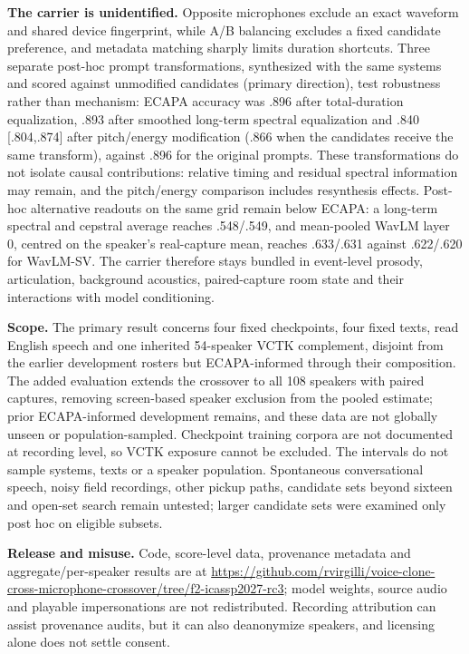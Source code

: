 \documentclass[10pt,twocolumn,letterpaper]{article}
\begin{document}
\textbf{The carrier is unidentified.} Opposite microphones exclude an exact
waveform and shared device fingerprint, while A/B balancing excludes a fixed
candidate preference, and metadata matching sharply limits duration shortcuts.
Three separate post-hoc prompt transformations, synthesized with the same
systems and scored against unmodified candidates (primary direction), test
robustness rather than mechanism: ECAPA accuracy was .896 after
total-duration equalization, .893 after smoothed long-term spectral
equalization and .840 [.804,.874] after pitch/energy modification (.866 when
the candidates receive the same transform), against .896 for the original
prompts. These transformations do not isolate causal contributions: relative
timing and residual spectral information may remain, and the pitch/energy
comparison includes resynthesis effects. Post-hoc alternative readouts on the
same grid remain below ECAPA: a long-term spectral and cepstral average reaches
.548/.549, and mean-pooled WavLM layer 0, centred on the speaker's real-capture
mean, reaches .633/.631 against .622/.620 for WavLM-SV. The carrier therefore
stays bundled in event-level prosody, articulation, background acoustics,
paired-capture room state and their interactions with model conditioning.

\textbf{Scope.} The primary result concerns four fixed checkpoints, four fixed
texts, read English speech and one inherited 54-speaker VCTK complement,
disjoint from the earlier development rosters but ECAPA-informed through their
composition. The added evaluation extends the crossover to all 108 speakers
with paired captures, removing screen-based speaker exclusion from the pooled
estimate; prior ECAPA-informed development remains, and these data are not
globally unseen or population-sampled. Checkpoint
training corpora are not documented at recording level, so VCTK exposure cannot be
excluded. The intervals do not sample systems, texts or a speaker
population. Spontaneous conversational speech, noisy field recordings, other
pickup paths, candidate sets beyond sixteen and open-set search remain
untested; larger candidate sets were examined only post hoc on eligible
subsets.

\textbf{Release and misuse.} Code, score-level data, provenance metadata and
aggregate/per-speaker results are at \url{https://github.com/rvirgilli/voice-clone-cross-microphone-crossover/tree/f2-icassp2027-rc3};
model weights, source audio and playable impersonations are not redistributed.
Recording attribution can assist provenance audits, but it can also deanonymize
speakers, and licensing alone does not settle consent.
\end{document}
